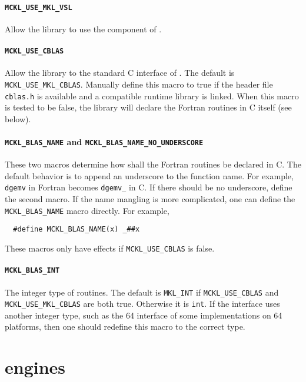 \paragraph{\texttt{MCKL\_USE\_MKL\_VSL}} Allow the library to use the \vsl
component of \mkl.

\paragraph{\texttt{MCKL\_USE\_CBLAS}} Allow the library to the standard C
interface of \blas. The default is \verb|MCKL_USE_MKL_CBLAS|. Manually define
this macro to true if the header file \verb|cblas.h| is available and a
compatible runtime library is linked. When this macro is tested to be false,
the library will declare the \blas Fortran routines in C itself (see below).

\paragraph{\texttt{MCKL\_BLAS\_NAME} and
  \texttt{MCKL\_BLAS\_NAME\_NO\_UNDERSCORE}} These two macros determine how
shall the \blas Fortran routines be declared in C. The default behavior is to
append an underscore to the function name. For example, \verb|dgemv| in Fortran
becomes \verb|dgemv_| in C. If there should be no underscore, define the second
macro. If the name mangling is more complicated, one can define the
\verb|MCKL_BLAS_NAME| macro directly. For example,
\begin{Verbatim}
  #define MCKL_BLAS_NAME(x) _##x
\end{Verbatim}
These macros only have effects if \verb|MCKL_USE_CBLAS| is false.

\paragraph{\texttt{MCKL\_BLAS\_INT}} The integer type of \blas routines. The
default is \verb|MKL_INT| if \verb|MCKL_USE_CBLAS| and
\verb|MCKL_USE_MKL_CBLAS| are both true. Otherwise it is \verb|int|. If the
\blas interface uses another integer type, such as the \ilp{}64 interface of
some implementations on \lp{}64 platforms, then one should redefine this macro
to the correct type.

\section{\protect\rng engines}
\label{sec:RNG engines}

